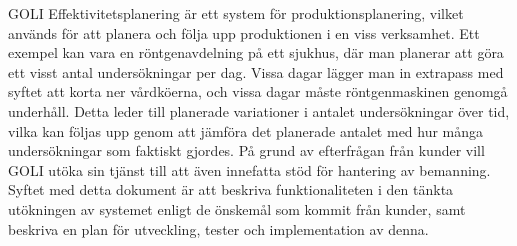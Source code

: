 GOLI Effektivitetsplanering är ett system för produktionsplanering,
vilket används för att planera och följa upp produktionen i en viss
verksamhet. Ett exempel kan vara en röntgenavdelning på ett sjukhus, där
man planerar att göra ett visst antal undersökningar per dag. Vissa
dagar lägger man in extrapass med syftet att korta ner vårdköerna, och
vissa dagar måste röntgenmaskinen genomgå underhåll. Detta leder till
planerade variationer i antalet undersökningar över tid, vilka kan
följas upp genom att jämföra det planerade antalet med hur många
undersökningar som faktiskt gjordes. På grund av efterfrågan från kunder
vill GOLI utöka sin tjänst till att även innefatta stöd för hantering av
bemanning.\\

Syftet med detta dokument är att beskriva funktionaliteten i den tänkta
utökningen av systemet enligt de önskemål som kommit från kunder, samt
beskriva en plan för utveckling, tester och implementation av denna.\\
